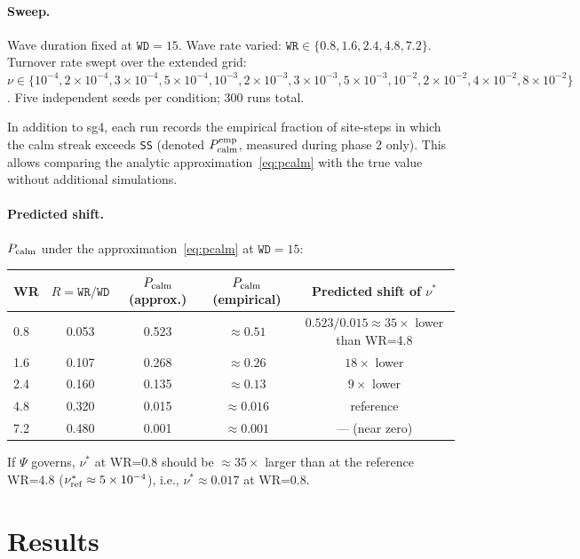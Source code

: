 \documentclass[11pt]{article}
\begin{document}
\paragraph{Sweep.}
Wave duration fixed at $\texttt{WD}=15$.
Wave rate varied: $\texttt{WR} \in \{0.8, 1.6, 2.4, 4.8, 7.2\}$.
Turnover rate swept over the extended grid:
$\nu \in \{10^{-4}, 2\times10^{-4}, 3\times10^{-4}, 5\times10^{-4},
10^{-3}, 2\times10^{-3}, 3\times10^{-3}, 5\times10^{-3},
10^{-2}, 2\times10^{-2}, 4\times10^{-2}, 8\times10^{-2}\}$.
Five independent seeds per condition; 300 runs total.

In addition to sg4, each run records the empirical fraction of site-steps
in which the calm streak exceeds \texttt{SS} (denoted $P_{\rm calm}^{\rm emp}$,
measured during phase 2 only).
This allows comparing the analytic approximation~\eqref{eq:pcalm} with the
true value without additional simulations.

\paragraph{Predicted shift.}
$P_{\rm calm}$ under the approximation~\eqref{eq:pcalm} at $\texttt{WD}=15$:
\begin{center}
\begin{tabular}{lcccc}
\toprule
WR & $R=\texttt{WR}/\texttt{WD}$ & $P_{\rm calm}$ (approx.) & $P_{\rm calm}$ (empirical) & Predicted shift of $\nu^*$ \\
\midrule
0.8 & 0.053 & 0.523 & $\approx 0.51$ & $0.523/0.015 \approx 35\times$ lower than WR=4.8 \\
1.6 & 0.107 & 0.268 & $\approx 0.26$ & $18\times$ lower \\
2.4 & 0.160 & 0.135 & $\approx 0.13$ & $9\times$ lower \\
4.8 & 0.320 & 0.015 & $\approx 0.016$ & reference \\
7.2 & 0.480 & 0.001 & $\approx 0.001$ & --- (near zero) \\
\bottomrule
\end{tabular}
\end{center}
If $\Psi$ governs, $\nu^*$ at WR=0.8 should be $\approx 35\times$ larger than
at the reference WR=4.8 ($\nu^*_{\rm ref} \approx 5\times10^{-4}$),
i.e., $\nu^* \approx 0.017$ at WR=0.8.

\section{Results}
\end{document}

